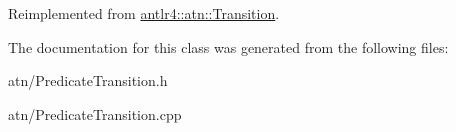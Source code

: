 Reimplemented from \hyperlink{classantlr4_1_1atn_1_1Transition_a8e712c7a46586d73c054c56f481b1be7}{antlr4\+::atn\+::\+Transition}.



The documentation for this class was generated from the following files\+:\begin{DoxyCompactItemize}
\item 
atn/Predicate\+Transition.\+h\item 
atn/Predicate\+Transition.\+cpp\end{DoxyCompactItemize}
